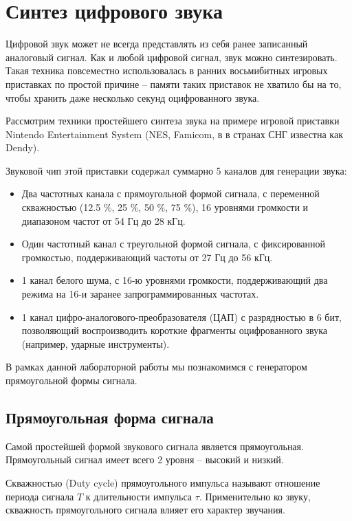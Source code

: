 \section{Синтез цифрового звука}

Цифровой звук может не всегда представлять из себя ранее записанный аналоговый сигнал.
Как и любой цифровой сигнал, звук можно синтезировать.
Такая техника повсеместно использовалась в ранних восьмибитных игровых приставках по простой причине -- памяти таких приставок не хватило бы на то, чтобы хранить даже несколько секунд оцифрованного звука.

Рассмотрим техники простейшего синтеза звука на примере игровой приставки Nintendo Entertainment System (NES, Famicom, в в странах СНГ известна как Dendy).

Звуковой чип этой приставки содержал суммарно 5 каналов для генерации звука:

\begin{itemize}
	\item Два частотных канала с прямоугольной формой сигнала, с переменной скважностью (12.5 \%, 25 \%, 50 \%, 75 \%), 16 уровнями громкости и диапазоном частот от 54 Гц до 28 кГц.
	\item Один частотный канал с треугольной формой сигнала, с фиксированной громкостью, поддерживающий частоты от 27 Гц до 56 кГц.
	\item 1 канал белого шума, с 16-ю уровнями громкости, поддерживающий два режима на 16-и заранее запрограммированных частотах. 
	\item 1 канал цифро-аналогового-преобразователя (ЦАП) с разрядностью в 6 бит, позволяющий воспроизводить короткие фрагменты оцифрованного звука (например, ударные инструменты).

\end{itemize}

В рамках данной лабораторной работы мы познакомимся с генератором прямоугольной формы сигнала.

\subsection{Прямоугольная форма сигнала}

Самой простейшей формой звукового сигнала является прямоугольная. Прямоугольный сигнал имеет всего 2 уровня -- высокий и низкий. 


Скважностью (Duty cycle) прямоугольного импульса называют отношение периода сигнала $T$ к длительности импульса $\tau$. Применительно ко звуку, скважность прямоугольного сигнала влияет его характер звучания.

